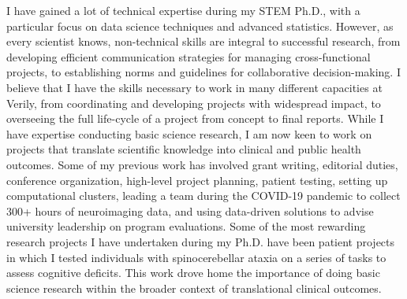 \documentclass[9pt, a4paper]{maedbh-cv}
\begin{document}
\begin{cvletter}
I have gained a lot of technical expertise during my STEM Ph.D., with a particular focus on data science techniques and advanced statistics. However, as every scientist knows, non-technical skills are integral to successful research, from developing efficient communication strategies for managing cross-functional projects, to establishing norms and guidelines for collaborative decision-making. I believe that I have the skills necessary to work in many different capacities at Verily, from coordinating and developing projects with widespread impact, to overseeing the full life-cycle of a project from concept to final reports. While I have expertise conducting basic science research, I am now keen to work on projects that translate scientific knowledge into clinical and public health outcomes. Some of my previous work has involved grant writing, editorial duties, conference organization, high-level project planning, patient testing, setting up computational clusters, leading a team during the COVID-19 pandemic to collect 300+ hours of neuroimaging data, and using data-driven solutions to advise university leadership on program evaluations. Some of the most rewarding research projects I have undertaken during my Ph.D. have been patient projects in which I tested individuals with spinocerebellar ataxia on a series of tasks to assess cognitive deficits. This work drove home the importance of doing basic science research within the broader context of translational clinical outcomes. 
 

\end{cvletter}

\makeletterclosing
\end{document}
